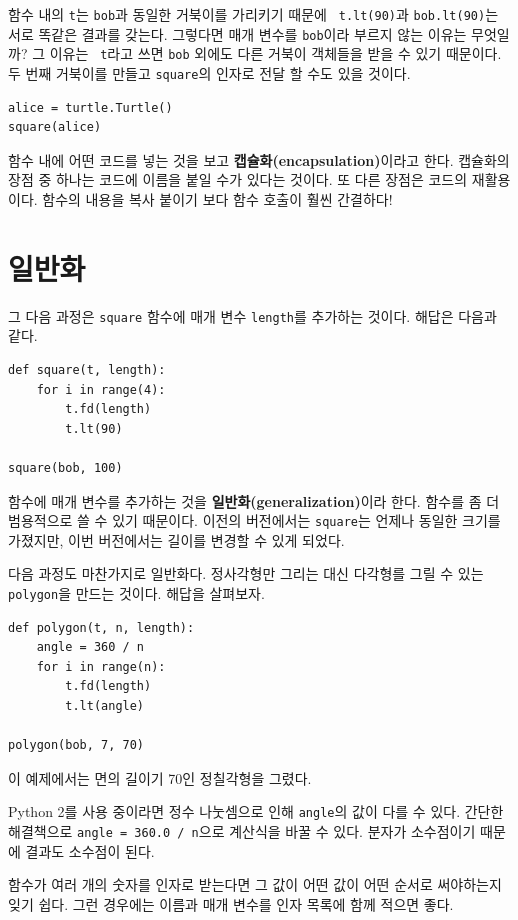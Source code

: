 \documentclass[10pt]{book}
\begin{document}
함수 내의 {\tt t}는 {\tt bob}과 동일한 거북이를 가리키기 때문에 {\tt
  t.lt(90)}과 {\tt bob.lt(90)}는 서로 똑같은 결과를 갖는다.  그렇다면
매개 변수를 {\tt bob}이라 부르지 않는 이유는 무엇일까?  그 이유는 {\tt
  t}라고 쓰면 {\tt bob} 외에도 다른 거북이 객체들을 받을 수 있기
때문이다. 두 번째 거북이를 만들고 {\tt square}의 인자로 전달 할 수도
있을 것이다.


\begin{verbatim}
alice = turtle.Turtle()
square(alice)
\end{verbatim}
%
함수 내에 어떤 코드를 넣는 것을 보고 {\bf 캡슐화(encapsulation)}이라고
한다.  캡슐화의 장점 중 하나는 코드에 이름을 붙일 수가 있다는 것이다.
또 다른 장점은 코드의 재활용이다.  함수의 내용을 복사 붙이기 보다 함수
호출이 훨씬 간결하다!  


\section{일반화}

그 다음 과정은 {\tt square} 함수에 매개 변수 {\tt length}를 추가하는
것이다.  해답은 다음과 같다.


\begin{verbatim}
def square(t, length):
    for i in range(4):
        t.fd(length)
        t.lt(90)

square(bob, 100)
\end{verbatim}
%
함수에 매개 변수를 추가하는 것을 {\bf 일반화(generalization)}이라
한다.  함수를 좀 더 범용적으로 쓸 수 있기 때문이다.  이전의 버전에서는
\texttt{square}는 언제나 동일한 크기를 가졌지만, 이번 버전에서는 길이를
변경할 수 있게 되었다.

다음 과정도 마찬가지로 일반화다.  정사각형만 그리는 대신 다각형를
그릴 수 있는 {\tt polygon}을 만드는 것이다.  해답을 살펴보자.

\begin{verbatim}
def polygon(t, n, length):
    angle = 360 / n
    for i in range(n):
        t.fd(length)
        t.lt(angle)

polygon(bob, 7, 70)
\end{verbatim}
%
이 예제에서는 면의 길이기 70인 정칠각형을 그렸다. 

Python 2를 사용 중이라면 정수 나눗셈으로 인해 {\tt angle}의 값이 다를
수 있다.  간단한 해결책으로 {\tt angle = 360.0 / n}으로 계산식을 바꿀
수 있다.  분자가 소수점이기 때문에 결과도 소수점이 된다.

함수가 여러 개의 숫자를 인자로 받는다면 그 값이 어떤 값이 어떤 순서로
써야하는지 잊기 쉽다.  그런 경우에는 이름과 매개 변수를 인자 목록에
함께 적으면 좋다.
\end{document}
